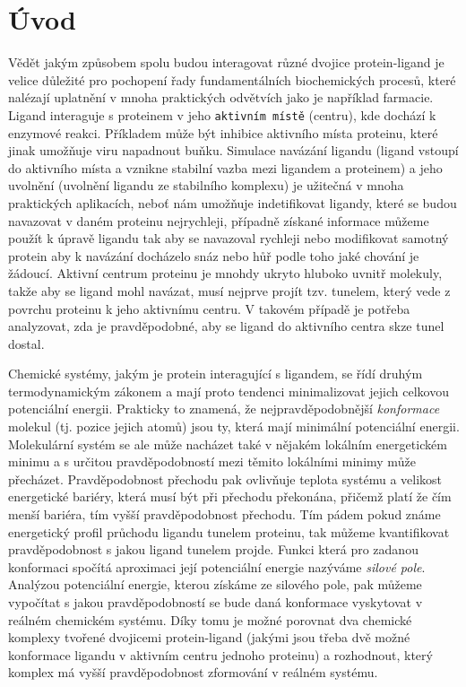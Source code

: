 \chapter*{Úvod}

Vědět jakým způsobem spolu budou interagovat různé dvojice protein-ligand je
velice důležité pro pochopení řady fundamentálních biochemických procesů, které
nalézají uplatnění v mnoha praktických odvětvích jako je například farmacie.
Ligand interaguje s proteinem v jeho \texttt{aktivním místě} (centru), kde dochází
k enzymové reakci. Příkladem může být inhibice aktivního místa proteinu, které
jinak umožňuje viru napadnout buňku. Simulace navázání ligandu (ligand vstoupí
do aktivního místa a vznikne stabilní vazba mezi ligandem a proteinem) a jeho
uvolnění (uvolnění ligandu ze stabilního komplexu) je užitečná v mnoha praktických
aplikacích, neboť nám umožňuje indetifikovat ligandy, které se budou navazovat
v daném proteinu nejrychleji, případně získané informace můžeme použít k úpravě
ligandu tak aby se navazoval rychleji nebo modifikovat samotný protein aby k
navázání docházelo snáz nebo hůř podle toho jaké chování je žádoucí. Aktivní
centrum proteinu je mnohdy ukryto hluboko uvnitř molekuly, takže aby se ligand
mohl navázat, musí nejprve projít tzv. tunelem, který vede z povrchu proteinu
k jeho aktivnímu centru. V takovém případě je potřeba analyzovat, zda je
pravděpodobné, aby se ligand do aktivního centra skze tunel dostal.

Chemické systémy, jakým je protein interagující s ligandem, se řídí druhým
termodynamickým zákonem a mají proto tendenci minimalizovat jejich
celkovou potenciální energii. Prakticky to znamená, že nejpravděpodobnější
\textit{konformace} molekul (tj. pozice jejich atomů) jsou ty, která mají minimální
potenciální energii. Molekulární systém se ale může nacházet také v nějakém
lokálním energetickém minimu a s určitou pravděpodobností mezi těmito lokálními
minimy může přecházet. Pravděpodobnost přechodu pak ovlivňuje teplota systému a
velikost energetické bariéry, která musí být při přechodu překonána, přičemž platí
že čím menší bariéra, tím vyšší pravděpodobnost přechodu. Tím pádem pokud známe
energetický profil průchodu ligandu tunelem proteinu, tak můžeme kvantifikovat
pravděpodobnost s jakou ligand tunelem projde. Funkci která pro zadanou konformaci
spočítá aproximaci její potenciální energie nazýváme \textit{silové pole}. Analýzou
potenciální energie, kterou získáme ze silového pole, pak můžeme vypočítat
s jakou pravděpodobností se bude daná konformace vyskytovat v reálném chemickém
systému. Díky tomu je možné porovnat dva chemické komplexy tvořené
dvojicemi protein-ligand (jakými jsou třeba dvě možné konformace ligandu
v aktivním centru jednoho proteinu) a rozhodnout, který komplex má vyšší
pravděpodobnost zformování v reálném systému.

